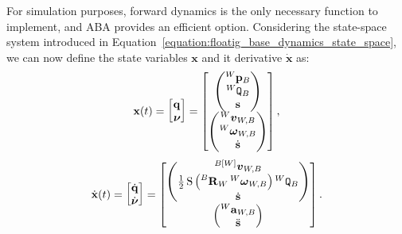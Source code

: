 For simulation purposes, forward dynamics is the only necessary function to implement, and \ac{ABA} provides an efficient option.
Considering the state-space system introduced in Equation~\eqref{equation:floatig_base_dynamics_state_space}, we can now define the state variables $\mathbf{x}$ and it derivative $\dot{\mathbf{x}}$ as:
%
\begin{equation*}
    \mathbf{x}(t) =
    \begin{bmatrix} \Qu \\ \Nu \end{bmatrix} =
    \begin{bmatrix}
        \begin{pmatrix}
            \pos[W]_B \\
            \quat[W]_B \\
            \Shape
        \end{pmatrix}
        \\
        \begin{pmatrix}
            \vellin[W]_{W,B} \\
            \velang[W]_{W,B} \\
            \Shaped
        \end{pmatrix}
    \end{bmatrix}
    ,
\end{equation*}
%
\begin{align*}
    \dot{\mathbf{x}}(t) =
    \begin{bmatrix}
        \dot{\mathbf{q}} \\ \dot{\boldsymbol{\nu}}
    \end{bmatrix} =
    \begin{bmatrix}
        \begin{pmatrix}
            \vellin[{B[W]}]_{W,B} \\
            \frac{1}{2} \operatorname{S}\left( \rot[B]_W \velang[W]_{W,B} \right) \quat[W]_B \\
            \dot{\mathbf{s}}
        \end{pmatrix}
        \\
        \begin{pmatrix}
            \accsix[W]_{W,B} \\
            \Shapedd
        \end{pmatrix}
    \end{bmatrix}
    .
\end{align*}


